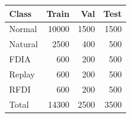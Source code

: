 \begin{tabular}{lrrr}
\toprule
Class & Train & Val & Test \\
\midrule
Normal & 10000 & 1500 & 1500 \\
Natural & 2500 & 400 & 500 \\
FDIA & 600 & 200 & 500 \\
Replay & 600 & 200 & 500 \\
RFDI & 600 & 200 & 500 \\
\midrule
Total & 14300 & 2500 & 3500 \\
\bottomrule
\end{tabular}
